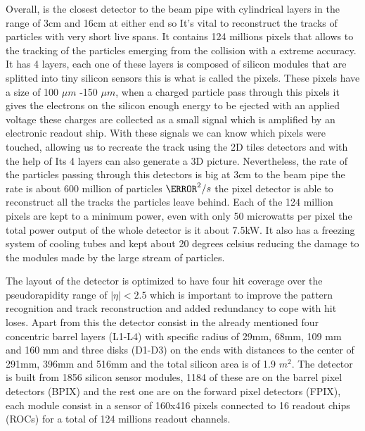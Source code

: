 Overall, is the closest detector to the beam pipe with cylindrical layers in the range of 3cm and 16cm at either end so It's vital to reconstruct the tracks of particles with very short live spans. It contains 124 millions pixels that allows to the tracking of the particles emerging from the collision with a extreme accuracy. It has 4 layers, each one of these layers is composed of silicon modules that are splitted into tiny silicon sensors this is what is called the pixels. These pixels have a size of 100 $\mu m$ -150 $\mu m$, when a charged particle pass through this pixels it gives the electrons on the silicon enough energy to be ejected with an applied voltage these charges are collected as a small signal which is amplified by an electronic readout ship. With these signals we can know which pixels were touched, allowing  us to recreate the track using the 2D tiles detectors and with the help of Its 4 layers can also generate a 3D picture. Nevertheless, the rate of the particles passing through this detectors is big at 3cm to the beam pipe the rate is about 600 million of particles $\cm^{2} / s$ the pixel detector is able to reconstruct all the tracks the particles leave behind. Each of the 124 million pixels are kept to a minimum power, even with only 50 microwatts per pixel the total power output of the whole detector is it about 7.5kW. It also has a freezing system of cooling tubes and kept about 20 degrees celsius reducing the damage to the modules made by the large stream of particles. 

The layout of the detector is optimized to have four hit coverage over the pseudorapidity range of  $|\eta| < 2.5$ which is important to improve the pattern recognition and track reconstruction and added redundancy to cope with hit loses. Apart from this the detector consist in the already mentioned four concentric barrel layers (L1-L4) with specific radius of 29mm, 68mm, 109 mm and 160 mm and three disks (D1-D3) on the ends with distances to the center of 291mm, 396mm and 516mm and the total silicon area is of 1.9 $m^{2}$. The detector is built from 1856 silicon sensor modules, 1184 of these are on the barrel pixel detectors (BPIX) and the rest one are on the forward pixel detectors (FPIX), each module consist in a sensor of 160x416 pixels connected to 16 readout chips (ROCs) for a total of 124 millions readout channels. \cite{pxd}

